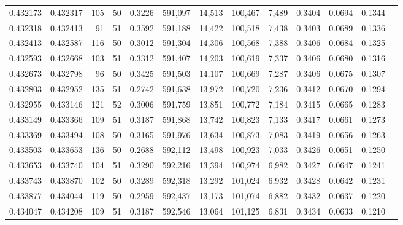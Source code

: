 \begin{tabular}{rrrrrrrrrrrrr}
0.432173 & 0.432317 &   105 &  50 &                                     0.3226 & 591,097 &  14,513 & 100,467 &   7,489 & 0.3404 & 0.0694 & 0.1344 \\
0.432318 & 0.432413 &    91 &  51 &                                     0.3592 & 591,188 &  14,422 & 100,518 &   7,438 & 0.3403 & 0.0689 & 0.1336 \\
0.432413 & 0.432587 &   116 &  50 &                                     0.3012 & 591,304 &  14,306 & 100,568 &   7,388 & 0.3406 & 0.0684 & 0.1325 \\
0.432593 & 0.432668 &   103 &  51 &                                     0.3312 & 591,407 &  14,203 & 100,619 &   7,337 & 0.3406 & 0.0680 & 0.1316 \\
0.432673 & 0.432798 &    96 &  50 &                                     0.3425 & 591,503 &  14,107 & 100,669 &   7,287 & 0.3406 & 0.0675 & 0.1307 \\
0.432803 & 0.432952 &   135 &  51 &                                     0.2742 & 591,638 &  13,972 & 100,720 &   7,236 & 0.3412 & 0.0670 & 0.1294 \\
0.432955 & 0.433146 &   121 &  52 &                                     0.3006 & 591,759 &  13,851 & 100,772 &   7,184 & 0.3415 & 0.0665 & 0.1283 \\
0.433149 & 0.433366 &   109 &  51 &                                     0.3187 & 591,868 &  13,742 & 100,823 &   7,133 & 0.3417 & 0.0661 & 0.1273 \\
0.433369 & 0.433494 &   108 &  50 &                                     0.3165 & 591,976 &  13,634 & 100,873 &   7,083 & 0.3419 & 0.0656 & 0.1263 \\
0.433503 & 0.433653 &   136 &  50 &                                     0.2688 & 592,112 &  13,498 & 100,923 &   7,033 & 0.3426 & 0.0651 & 0.1250 \\
0.433653 & 0.433740 &   104 &  51 &                                     0.3290 & 592,216 &  13,394 & 100,974 &   6,982 & 0.3427 & 0.0647 & 0.1241 \\
0.433743 & 0.433870 &   102 &  50 &                                     0.3289 & 592,318 &  13,292 & 101,024 &   6,932 & 0.3428 & 0.0642 & 0.1231 \\
0.433877 & 0.434044 &   119 &  50 &                                     0.2959 & 592,437 &  13,173 & 101,074 &   6,882 & 0.3432 & 0.0637 & 0.1220 \\
0.434047 & 0.434208 &   109 &  51 &                                     0.3187 & 592,546 &  13,064 & 101,125 &   6,831 & 0.3434 & 0.0633 & 0.1210 \\

\end{tabular}
